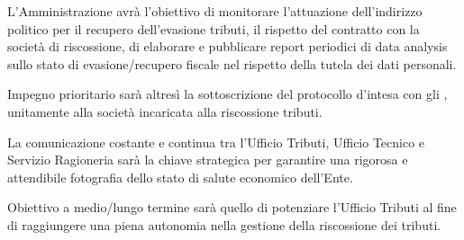 \documentclass[a4paper,14pt,italian]{sphinxmanual}
\begin{document}
L’Amministrazione avrà l’obiettivo di monitorare l’attuazione dell’indirizzo politico per il recupero dell’evasione tributi, il rispetto del contratto con la società di riscossione, di elaborare e pubblicare report periodici di data analysis sullo stato di evasione/recupero fiscale nel rispetto della tutela dei dati personali.

Impegno prioritario sarà altresì la sottoscrizione del protocollo d’intesa con gli , unitamente alla società incaricata alla riscossione tributi.

La comunicazione costante e continua tra l’Ufficio Tributi, Ufficio Tecnico e Servizio Ragioneria sarà la chiave strategica per garantire una rigorosa e attendibile fotografia dello stato di salute economico dell’Ente.

Obiettivo a medio/lungo termine sarà quello di potenziare l’Ufficio Tributi al fine di raggiungere una piena autonomia nella gestione della riscossione dei tributi.
\end{document}
